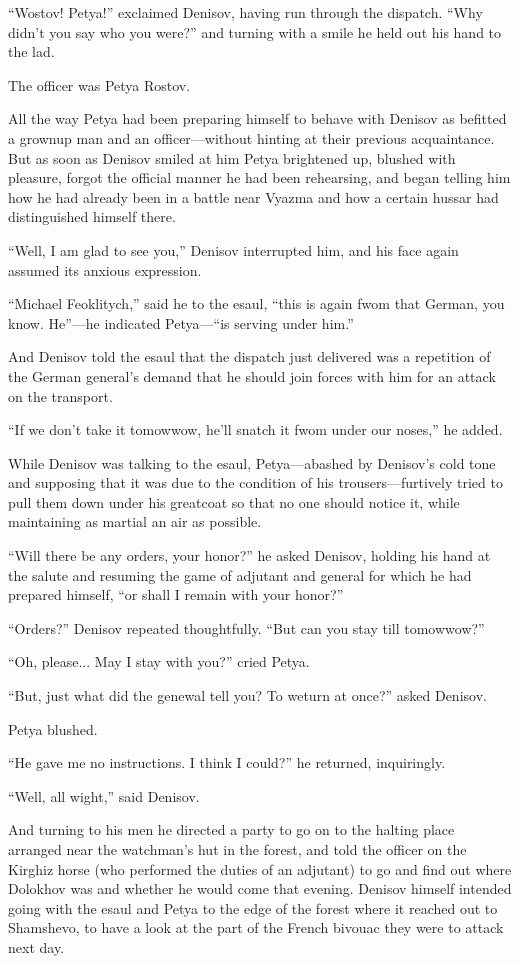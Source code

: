 ``Wostov! Petya!'' exclaimed Denisov, having run through the
dispatch.  ``Why didn't you say who you were?'' and turning with
a smile he held out his hand to the lad.

The officer was Petya Rostov.

All the way Petya had been preparing himself to behave with
Denisov as befitted a grownup man and an officer---without
hinting at their previous acquaintance. But as soon as Denisov
smiled at him Petya brightened up, blushed with pleasure, forgot
the official manner he had been rehearsing, and began telling him
how he had already been in a battle near Vyazma and how a certain
hussar had distinguished himself there.

``Well, I am glad to see you,'' Denisov interrupted him, and his
face again assumed its anxious expression.

``Michael Feoklitych,'' said he to the esaul, ``this is again
fwom that German, you know. He''---he indicated Petya---``is
serving under him.''

And Denisov told the esaul that the dispatch just delivered was a
repetition of the German general's demand that he should join
forces with him for an attack on the transport.

``If we don't take it tomowwow, he'll snatch it fwom under our
noses,'' he added.

While Denisov was talking to the esaul, Petya---abashed by
Denisov's cold tone and supposing that it was due to the
condition of his trousers---furtively tried to pull them down
under his greatcoat so that no one should notice it, while
maintaining as martial an air as possible.

``Will there be any orders, your honor?'' he asked Denisov,
holding his hand at the salute and resuming the game of adjutant
and general for which he had prepared himself, ``or shall I
remain with your honor?''

``Orders?'' Denisov repeated thoughtfully. ``But can you stay
till tomowwow?''

``Oh, please... May I stay with you?'' cried Petya.

``But, just what did the genewal tell you? To weturn at once?''
asked Denisov.

Petya blushed.

``He gave me no instructions. I think I could?'' he returned,
inquiringly.

``Well, all wight,'' said Denisov.

And turning to his men he directed a party to go on to the
halting place arranged near the watchman's hut in the forest, and
told the officer on the Kirghiz horse (who performed the duties
of an adjutant) to go and find out where Dolokhov was and whether
he would come that evening.  Denisov himself intended going with
the esaul and Petya to the edge of the forest where it reached
out to Shamshevo, to have a look at the part of the French
bivouac they were to attack next day.

